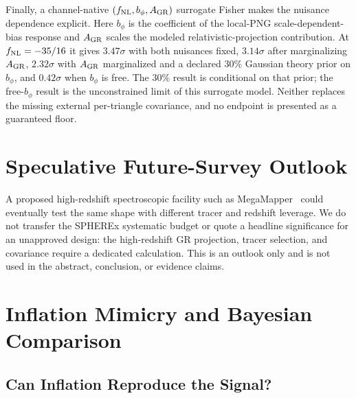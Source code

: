 \documentclass[aps,prd,twocolumn,superscriptaddress,showpacs,preprintnumbers,nofootinbib,longbibliography,floatfix]{revtex4-2}
\newcommand{\fnl}{f_{\rm NL}}
\begin{document}
Finally, a channel-native $(\fnl,b_\phi,A_{\rm GR})$ surrogate Fisher makes the nuisance dependence explicit. Here $b_\phi$ is the coefficient of the local-PNG scale-dependent-bias response and $A_{\rm GR}$ scales the modeled relativistic-projection contribution. At $\fnl=-35/16$ it gives $3.47\sigma$ with both nuisances fixed, $3.14\sigma$ after marginalizing $A_{\rm GR}$, $2.32\sigma$ with $A_{\rm GR}$ marginalized and a declared 30\% Gaussian theory prior on $b_\phi$, and $0.42\sigma$ when $b_\phi$ is free. The 30\% result is conditional on that prior; the free-$b_\phi$ result is the unconstrained limit of this surrogate model. Neither replaces the missing external per-triangle covariance, and no endpoint is presented as a guaranteed floor.
\section{Speculative Future-Survey Outlook}
\label{sec:megamapper}

A proposed high-redshift spectroscopic facility such as MegaMapper~\cite{Schlegel:2022} could eventually test the same shape with different tracer and redshift leverage. We do not transfer the SPHEREx systematic budget or quote a headline significance for an unapproved design: the high-redshift GR projection, tracer selection, and covariance require a dedicated calculation. This is an outlook only and is not used in the abstract, conclusion, or evidence claims.
\section{Inflation Mimicry and Bayesian Comparison}
\label{sec:bayesian}

\subsection{Can Inflation Reproduce the Signal?}
\end{document}

